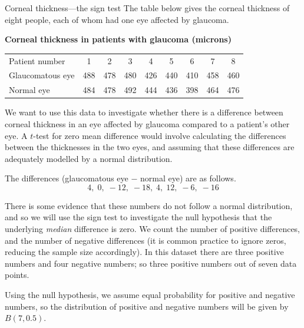 \begin{example}{Corneal thickness---the sign test}
  The table below gives the corneal thickness of eight people, each of whom had one eye affected by glaucoma.
    
  \textbf{Corneal thickness in patients with glaucoma (microns)}\\
  \begin{tabular}{lcccccccc}
    Patient number   & 1   & 2   & 3   & 4   & 5   & 6   & 7   & 8   \\
    Glaucomatous eye & 488 & 478 & 480 & 426 & 440 & 410 & 458 & 460 \\
    Normal eye       & 484 & 478 & 492 & 444 & 436 & 398 & 464 & 476
  \end{tabular}
  
  We want to use this data to investigate whether there is a difference between corneal thickness in an eye affected by glaucoma compared to a patient's other eye.
  A $t$-test for zero mean difference would involve calculating the differences between the thicknesses in the two eyes, and assuming that these differences are adequately modelled by a normal distribution.
  
  The differences (glaucomatous eye $-$ normal eye) are as follows.
  $$4,\; 0,\; -12,\; -18,\; 4,\; 12,\; -6,\; -16$$
  
  There is some evidence that these numbers do not follow a normal distribution, and so we will use the sign test to investigate the null hypothesis that the underlying \emph{median} difference is zero.
  We count the number of positive differences, and the number of negative differences (it is common practice to ignore zeros, reducing the sample size accordingly).
  In this dataset there are three positive numbers and four negative numbers; so three positive numbers out of seven data points.
  
  Using the null hypothesis, we assume equal probability for positive and negative numbers, so the distribution of positive and negative numbers will be given by $B\left(7,0.5\right)$.
  

\end{example}
